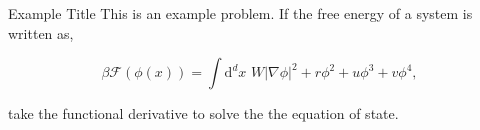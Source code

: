 \begin{problem}{3.1415}{Example Title}
This is an example problem. If the free energy of a system is written as, 

$$ \beta \mathcal{F}\left(\phi(x)\right) = \int \mathrm{d}^dx \,\, W \lvert \nabla \phi \rvert ^2 + r\phi^2 + u\phi^3 + v \phi^4,  $$

take the functional derivative to solve the the equation of state.

\end{problem}